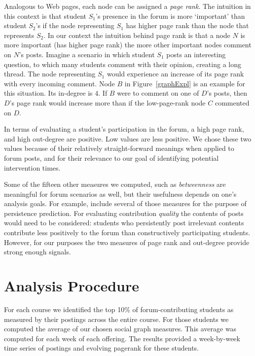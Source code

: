 Analogous to Web pages, each node can be assigned a {\em page
  rank}. The intuition in this context is that student $S_1$'s
presence in the forum is more `important' than student $S_2$'s if the
node representing $S_1$ has higher page rank than the node that
represents $S_2$. In our context the intuition behind page rank is
that a node $N$ is more important (has higher page rank) the more
other important nodes comment on $N$'s posts. Imagine a scenario
in which student $S_1$ posts an interesting question, to which many
students comment with their opinion, creating a long thread. The node
representing $S_1$ would experience an increase of its page rank with
every incoming comment. Node $B$ in Figure~\ref{graphExpl} is an
example for this situation. Its in-degree is $4$. If $B$ were to
comment on one of $D$'s posts, then $D$'s page rank would increase
more than if the low-page-rank node $C$ commented on $D$.

In terms of evaluating a student's participation in the forum, a high
page rank, and high out-degree are positive. Low values are less
positive. We chose these two values because of their relatively
straight-forward meanings when applied to forum posts, and for their
relevance to our goal of identifying potential intervention times.

Some of the fifteen other measures we computed, such as {\em
  betweenness} are meaningful for forum scenarios as well, but their
usefulness depends on one's analysis goals. For example,
\cite{yang2013} include several of those measures for the purpose of
persistence prediction. For evaluating contribution {\em quality} the
contents of posts would need to be considered: students who
persistently post irrelevant contents contribute less positively to
the forum than constructively participating students. However, for our
purposes the two measures of page rank and out-degree provide strong
enough signals.

\section{Analysis Procedure}

For each course we identified the top 10\% of forum-contributing
students as measured by their postings across the entire course. For
those students we computed the average of our chosen social graph
measures. This average was computed for each week of each
offering. The results provided a week-by-week time series of postings
and evolving pagerank for these students.


